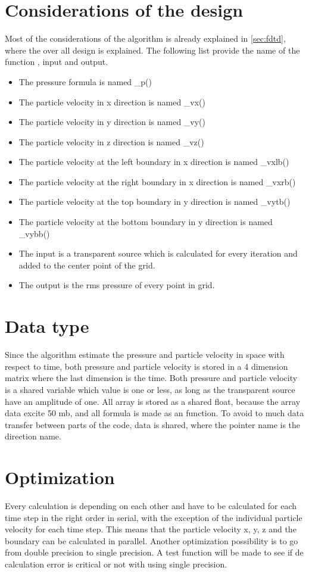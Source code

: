 \section{Considerations of the design} \label{ch:considerations}
Most of the considerations of the algorithm is already explained in \autoref{sec:fdtd}, where the over all design is explained. The following list provide the name of the function , input and output. 

\begin{itemize}
\item The pressure formula is named _p() 
\item The particle velocity in x direction is named _vx()
\item The particle velocity in y direction is named _vy()
\item The particle velocity in z direction is named _vz()
\item The particle velocity at the left boundary in x direction is named _vxlb()
\item The particle velocity at the right boundary in x direction is named _vxrb()
\item The particle velocity at the top boundary in y direction is named _vytb()
\item The particle velocity at the bottom boundary in y direction is named _vybb()
\item The input is a transparent source which is calculated for every iteration and added to the center point of the grid. 
\item The output is the \gls{rms} pressure of every point in grid.
\end{itemize}

\section{Data type}
Since the algorithm estimate the pressure and particle velocity in space with respect to time, both pressure and particle velocity is stored in a 4 dimension matrix where the last dimension is the time. Both pressure and particle velocity is a shared variable which value is one or less, as long as the transparent source have an amplitude of one. All array is stored as a shared float, because the array data excite 50 mb, and all formula is made as an function. To avoid to much data transfer between parts of the code, data is shared, where the pointer name is the direction name.



\section{Optimization}
Every calculation is depending on each other and have to be calculated for each time step in the right order in serial, with the exception of the individual particle velocity for each time step. This means that the particle velocity x, y, z and the boundary can be calculated in parallel. Another optimization possibility is to go from double precision to single precision. A test function will be made to see if de calculation error is critical or not with using single precision.

